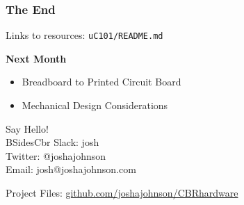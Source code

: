 \documentclass[t]{beamer}
\begin{document}

\begin{frame}
\frametitle{The End}
Links to resources: \texttt{uC101/README.md}
\vspace{5mm}

\textbf{Next Month}
\begin{itemize}
	\item Breadboard to Printed Circuit Board
	\item Mechanical Design Considerations	
\end{itemize}

\vspace{20mm}
Say Hello! \\
BSidesCbr Slack: josh\\
Twitter: @\textunderscore joshajohnson\\
Email: josh@joshajohnson.com\\
\vspace{4mm}

Project Files: \url{github.com/joshajohnson/CBRhardware}\\\end{frame}
\end{document}
